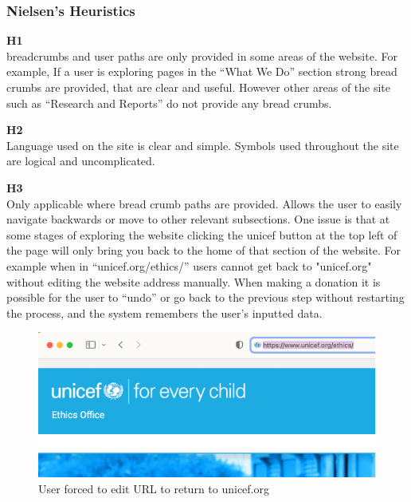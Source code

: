 \subsubsection{Nielsen's Heuristics}
\begin{description}
    \item {\textbf{H1} \color{unicefGray}{Visibility of the system status}}\\
    breadcrumbs and user paths are only provided in some areas of the website. For example, If a user is exploring pages in the “What We Do” section strong bread crumbs are provided, that are clear and useful. 
    However other areas of the site such as “Research and Reports” do not provide any bread crumbs.
    \item {\textbf{H2} \color{unicefGray}{Match between system and the real world}}\\
    Language used on the site is clear and simple. Symbols used throughout the site are logical and uncomplicated.     
    \newpage
    \item {\textbf{H3} \color{unicefGray}{User control and freedom}}\\
    Only applicable where bread crumb paths are provided. Allows the user to easily navigate backwards or move to other relevant subsections. 
    One issue is that at some stages of exploring the website clicking the unicef button at the top left of the page will only bring you back to the home of that section of the website. 
    For example when in “unicef.org/ethics/” users cannot get back to "unicef.org" without editing the website address manually.
    When making a donation it is possible for the user to “undo” or go back to the previous step without restarting the process, and the system remembers the user’s inputted data. 
    \begin{figure}[h]
        \centering
        \includegraphics[scale=1.0]{Resources/Harry/Harry_H3.png}
        \caption{User forced to edit URL to return to unicef.org}
    \end{figure}

\end{description}
